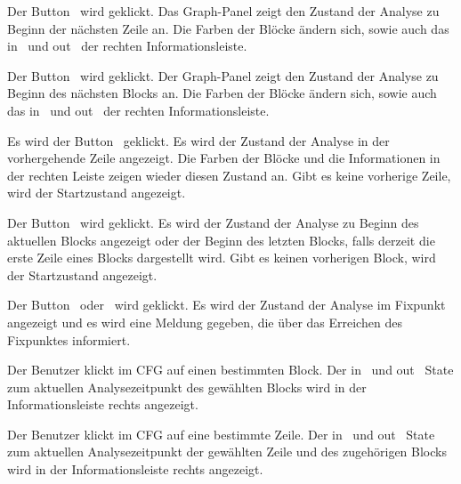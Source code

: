 {Der Button \faForward\ wird geklickt.}
{Das Graph-Panel zeigt den Zustand der Analyse zu Beginn der nächsten Zeile an. Die Farben der Blöcke ändern sich, sowie auch das \glqq in \grqq\ und \glqq out \grqq\ der rechten Informationsleiste.}

{Der Button \faFastForward\ wird geklickt.}
{Der Graph-Panel zeigt den Zustand der Analyse zu Beginn des nächsten Blocks an. Die Farben der Blöcke ändern sich, sowie auch das \glqq in \grqq\ und \glqq out \grqq\ der rechten Informationsleiste.}

{Es wird der Button \faBackward\ geklickt.}
{Es wird der Zustand der Analyse in der vorhergehende Zeile angezeigt. Die Farben der Blöcke und die Informationen in der rechten Leiste zeigen wieder diesen Zustand an. Gibt es keine vorherige Zeile, wird der Startzustand angezeigt.}

{Der Button \faFastBackward\ wird geklickt.}
{Es wird der Zustand der Analyse zu Beginn des aktuellen Blocks angezeigt oder der Beginn des letzten Blocks, falls derzeit die erste Zeile eines Blocks dargestellt wird. Gibt es keinen vorherigen Block, wird der Startzustand angezeigt.}

{Der Button \faForward\ oder \faFastForward\ wird geklickt.}
{Es wird der Zustand der Analyse im Fixpunkt angezeigt und es wird eine Meldung gegeben, die über das Erreichen des Fixpunktes informiert.}



{Der Benutzer klickt im CFG auf einen bestimmten Block.}
{Der \glqq in \grqq\ und \glqq out \grqq\ State zum aktuellen Analysezeitpunkt des gewählten Blocks wird in der Informationsleiste rechts angezeigt.}

{Der Benutzer klickt im CFG auf eine bestimmte Zeile.}
{Der \glqq in \grqq\ und \glqq out \grqq\ State zum aktuellen Analysezeitpunkt der gewählten Zeile und des zugehörigen Blocks wird in der Informationsleiste rechts angezeigt.}

